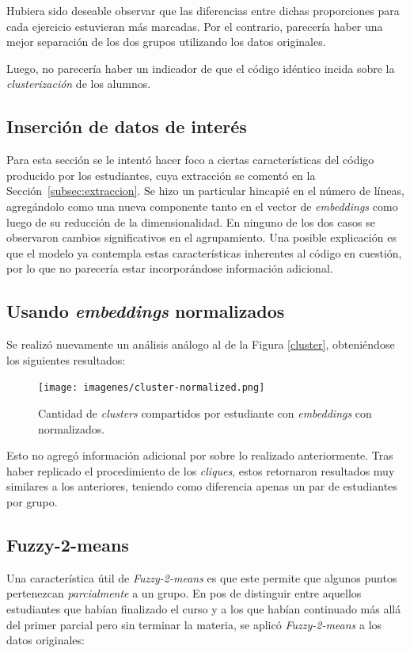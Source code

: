 \documentclass[11pt,a4paper,twoside,openany]{tesis}
\begin{document}
Hubiera sido deseable observar que las diferencias entre dichas proporciones para cada ejercicio estuvieran más marcadas. Por el contrario, parecería haber una mejor separación de los dos grupos utilizando los datos originales.

Luego, no parecería haber un indicador de que el código idéntico incida sobre la \emph{clusterización} de los alumnos.


\subsection{Inserción de datos de interés}
Para esta sección se le intentó hacer foco a ciertas características del código producido por los estudiantes, cuya extracción se comentó en la Sección~\ref{subsec:extraccion}. Se hizo un particular hincapié en el número de líneas, agregándolo como una nueva componente tanto en el vector de \emph{embeddings} como luego de su reducción de la dimensionalidad. En ninguno de los dos casos se observaron cambios significativos en el agrupamiento. Una posible explicación es que el modelo ya contempla estas características inherentes al código en cuestión, por lo que no parecería estar incorporándose información adicional. 


\subsection{Usando \emph{embeddings} normalizados}
Se realizó nuevamente un análisis análogo al de la Figura \ref{cluster}, obteniéndose los siguientes resultados:

\begin{figure}[H]
    \centering
    \texttt{[image: imagenes/cluster-normalized.png]}
    \caption{Cantidad de \emph{clusters} compartidos por estudiante con \emph{embeddings} con normalizados.}
\end{figure}

Esto no agregó información adicional por sobre lo realizado anteriormente. Tras haber replicado el procedimiento de los \emph{cliques}, estos retornaron resultados muy similares a los anteriores, teniendo como diferencia apenas un par de estudiantes por grupo. 



\subsection{Fuzzy-2-means}

Una característica útil de \emph{Fuzzy-2-means} es que este permite que algunos puntos pertenezcan \emph{parcialmente} a un grupo. En pos de distinguir entre aquellos estudiantes que habían finalizado el curso y a los que habían continuado más allá del primer parcial pero sin terminar la materia, se aplicó \emph{Fuzzy-2-means} a los datos originales: 
\end{document}
